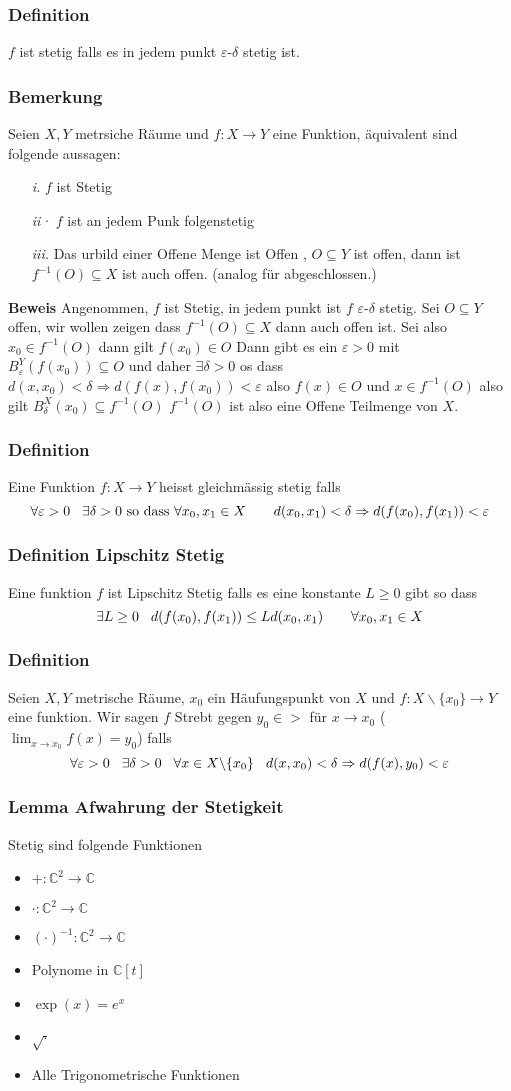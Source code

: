 \documentclass{article}
\newcommand{\mspc}{\hspace{0.7cm}}
\newcommand{\smspc}{\hspace{0.3cm}}
\newcommand{\bemerkung}[1]{\subsubsection*{Bemerkung {#1}}}
\newcommand{\lemma}[1]{\subsubsection*{Lemma {#1}}}
\newcommand{\definition}[1]{\subsubsection*{Definition {#1}}}
\begin{document}
\definition{} $f$ ist stetig falls es in jedem punkt $\varepsilon$-$\delta$ stetig ist.
\bemerkung{} Seien $X,Y$ metrsiche Räume und $f:X\rightarrow Y$ eine Funktion, äquivalent sind folgende aussagen:
\begin{itemize}
  \item[\textit{i.}]{ $f$ ist Stetig}
  \item[\textit{ii·}]{$f$ ist an jedem Punk folgenstetig}
  \item[\textit{iii.}]{Das urbild einer Offene Menge ist Offen , $O\subseteq Y$ ist offen, dann ist $f^{-1}(O)\subseteq X$ ist auch offen. (analog für abgeschlossen.)}
\end{itemize}
\textbf{Beweis} Angenommen, $f$ ist Stetig, in jedem punkt ist $f$ $\varepsilon$-$\delta$ stetig. Sei $O\subseteq Y$ offen, wir wollen zeigen dass $f^{-1}(O)\subseteq X$ dann auch offen ist. Sei also $x_0\in f^{-1}(O)$ dann gilt $f(x_0)\in O$ Dann gibt es ein $\varepsilon > 0$ mit $B_\varepsilon^Y(f(x_0))\subseteq O$ und daher $\exists \delta>0$ os dass $d(x,x_0)<\delta\Longrightarrow d(f(x),f(x_0))<\varepsilon$ also $f(x)\in O$ und $x\in f^{-1}(O)$ also gilt $B_\delta^X(x_0)\subseteq f^{-1}(O)$
$f^{-1}(O)$ ist also eine Offene Teilmenge von $X$.
\definition{} Eine Funktion $f:X\rightarrow Y$ heisst gleichmässig stetig falls \[\forall \varepsilon >0\smspc\exists \delta > 0\text{ so dass }\forall x_0,x_1\in X\mspc d(x_0,x_1)<\delta\Rightarrow d(f(x_0),f(x_1))<\varepsilon\]
\definition{Lipschitz Stetig} Eine funktion $f$ ist Lipschitz Stetig falls es eine konstante $L\ge 0$ gibt so dass \[\exists L\ge 0\smspc d(f(x_0),f(x_1))\le Ld(x_0,x_1)\mspc \forall x_0,x_1\in X\]
\definition{} Seien $X,Y$ metrische Räume, $x_0$ ein Häufungspunkt von $X$ und $f:X\backslash\lbrace x_0\rbrace\rightarrow Y$ eine funktion. Wir sagen $f$ Strebt gegen $y_0\in >$ für $x\rightarrow x_0$ ($\lim_{x\rightarrow x_0}f(x)=y_0$) falls \[\forall  \varepsilon>0\smspc\exists\delta >0\smspc\forall x\in X\backslash \lbrace x_0\rbrace\smspc d(x,x_0)<\delta\Rightarrow d(f(x),y_0)<\varepsilon\]
\lemma{Afwahrung der Stetigkeit}
Stetig sind folgende Funktionen
\begin{multicols}{2}
\begin{itemize}
  \item{$+:\mathbb{C}^2\rightarrow\mathbb{C}$}
  \item{$\cdot:\mathbb{C}^2\rightarrow\mathbb{C}$}
  \item{$(\cdot)^{-1}:\mathbb{C}^2\rightarrow\mathbb{C}$}
  \item{Polynome in $\mathbb{C}[t]$ }
  \item{$\exp(x)=e^x$}
  \item{$\sqrt{\cdot}$}
  \item{Alle Trigonometrische Funktionen}
\end{itemize}
\end{multicols}
\end{document}
